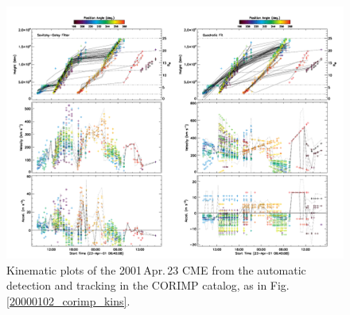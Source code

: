 \documentclass[referee,a4paper,12pt,traditabstract]{swsc}
\begin{document}
\begin{linenumbers}
\begin{figure}[t]
\centerline{\includegraphics[width=\linewidth]{images/20010423_corimp_kins.pdf}}
\caption{Kinematic plots of the 2001\,Apr.\,23 CME from the automatic detection and tracking in the CORIMP catalog, as in Fig.\,\ref{20000102_corimp_kins}.}
\label{20010423_corimp_kins}
\end{figure}



\end{linenumbers}
\end{document}
